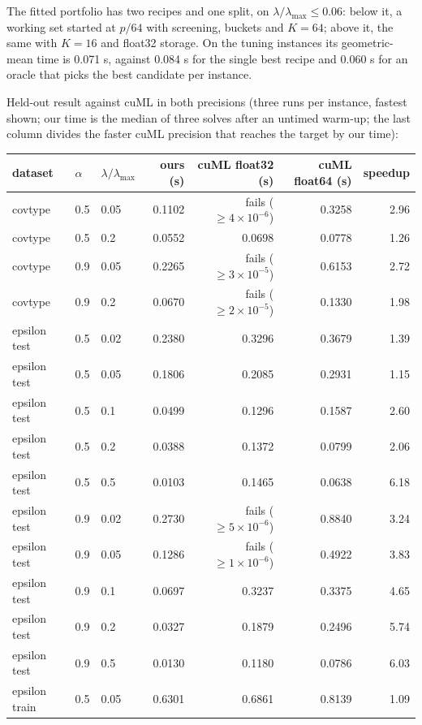 The fitted portfolio has two recipes and one split, on $\lambda/\lambda_{\max}\le0.06$:
below it, a working set started at $p/64$ with screening, buckets and $K=64$; above it,
the same with $K=16$ and float32 storage. On the tuning instances its geometric-mean
time is 0.071 s, against 0.084 s for the single best recipe and 0.060 s for an oracle
that picks the best candidate per instance.

Held-out result against cuML in both precisions (three runs per instance, fastest
shown; our time is the median of three solves after an untimed warm-up; the last
column divides the faster cuML precision that reaches the target by our time):

\begin{center}
\small
\begin{tabular}{lllrrrr}
\toprule
dataset & $\alpha$ & $\lambda/\lambda_{\max}$ & ours (s) & cuML float32 (s) & cuML float64 (s) & speedup \\
\midrule
covtype & 0.5 & 0.05 & 0.1102 & fails ($\ge4\times10^{-6}$) & 0.3258 & 2.96 \\
covtype & 0.5 & 0.2 & 0.0552 & 0.0698 & 0.0778 & 1.26 \\
covtype & 0.9 & 0.05 & 0.2265 & fails ($\ge3\times10^{-5}$) & 0.6153 & 2.72 \\
covtype & 0.9 & 0.2 & 0.0670 & fails ($\ge2\times10^{-5}$) & 0.1330 & 1.98 \\
epsilon test & 0.5 & 0.02 & 0.2380 & 0.3296 & 0.3679 & 1.39 \\
epsilon test & 0.5 & 0.05 & 0.1806 & 0.2085 & 0.2931 & 1.15 \\
epsilon test & 0.5 & 0.1 & 0.0499 & 0.1296 & 0.1587 & 2.60 \\
epsilon test & 0.5 & 0.2 & 0.0388 & 0.1372 & 0.0799 & 2.06 \\
epsilon test & 0.5 & 0.5 & 0.0103 & 0.1465 & 0.0638 & 6.18 \\
epsilon test & 0.9 & 0.02 & 0.2730 & fails ($\ge5\times10^{-6}$) & 0.8840 & 3.24 \\
epsilon test & 0.9 & 0.05 & 0.1286 & fails ($\ge1\times10^{-6}$) & 0.4922 & 3.83 \\
epsilon test & 0.9 & 0.1 & 0.0697 & 0.3237 & 0.3375 & 4.65 \\
epsilon test & 0.9 & 0.2 & 0.0327 & 0.1879 & 0.2496 & 5.74 \\
epsilon test & 0.9 & 0.5 & 0.0130 & 0.1180 & 0.0786 & 6.03 \\
epsilon train & 0.5 & 0.05 & 0.6301 & 0.6861 & 0.8139 & 1.09 \\

\end{tabular}
\end{center}
